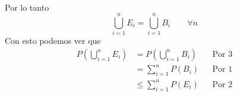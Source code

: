 \begin{enumerate}
\begin{align*}
            \end{align*}
            Por lo tanto
            \begin{equation}
                \bigcup_{i=1}^{n} E_i=\bigcup_{i=1}^{n} B_i\qquad\forall n
            \end{equation}
            Con esto podemos ver que
            \begin{align*}
                P\left(\bigcup\limits_{i=1}^n E_i\right)&=P\left(\bigcup\limits_{i=1}^n B_i\right)&&\text{Por 3}\\
                &=\sum_{i=1}^nP(B_i)&&\text{Por 1}\\
                &\leq \sum\limits_{i=1}^nP(E_i)&&\text{Por 2}
            \end{align*}
    \end{enumerate}